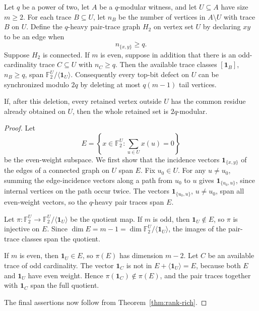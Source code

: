 \documentclass[thmsec,dntnbr,nolinenbrs]{dmgt}
\numberwithin{equation}{section}
\newcommand{\F}{\mathbb{F}}
\newcommand{\one}{\mathbf{1}}
\begin{document}
\begin{theorem}\label{thm:pair-trace-connected}
Let \(q\) be a power of two, let \(A\) be a \(q\)-modular witness, and let \(U\subseteq A\) have size \(m\ge 2\).  For each trace \(B\subseteq U\), let \(n_B\) be the number of vertices in \(A\setminus U\) with trace \(B\) on \(U\).  Define the \(q\)-heavy pair-trace graph \(H_2\) on vertex set \(U\) by declaring \(xy\) to be an edge when
\[
        n_{\{x,y\}}\ge q.
\]
Suppose \(H_2\) is connected.  If \(m\) is even, suppose in addition that there is an odd-cardinality trace \(C\subseteq U\) with \(n_C\ge q\).  Then the available trace classes \([\one_B]\), \(n_B\ge q\), span \(\F_2^U/\langle\one_U\rangle\).  Consequently every top-bit defect on \(U\) can be synchronized modulo \(2q\) by deleting at most \(q(m-1)\) tail vertices.

If, after this deletion, every retained vertex outside \(U\) has the common residue already obtained on \(U\), then the whole retained set is \(2q\)-modular.
\end{theorem}

\begin{proof}
Let
\[
        E=\left\{x\in\F_2^U:\sum_{u\in U}x(u)=0\right\}
\]
be the even-weight subspace.  We first show that the incidence vectors \(\one_{\{x,y\}}\) of the edges of a connected graph on \(U\) span \(E\).  Fix \(u_0\in U\).  For any \(u\ne u_0\), summing the edge-incidence vectors along a path from \(u_0\) to \(u\) gives \(\one_{\{u_0,u\}}\), since internal vertices on the path occur twice.  The vectors \(\one_{\{u_0,u\}}\), \(u\ne u_0\), span all even-weight vectors, so the \(q\)-heavy pair traces span \(E\).

Let \(\pi:\F_2^U\to \F_2^U/\langle\one_U\rangle\) be the quotient map.  If \(m\) is odd, then \(\one_U\notin E\), so \(\pi\) is injective on \(E\).  Since \(\dim E=m-1=\dim \F_2^U/\langle\one_U\rangle\), the images of the pair-trace classes span the quotient.

If \(m\) is even, then \(\one_U\in E\), so \(\pi(E)\) has dimension \(m-2\).  Let \(C\) be an available trace of odd cardinality.  The vector \(\one_C\) is not in \(E+\langle\one_U\rangle=E\), because both \(E\) and \(\one_U\) have even weight.  Hence \(\pi(\one_C)\notin \pi(E)\), and the pair traces together with \(\one_C\) span the full quotient.

The final assertions now follow from Theorem~\ref{thm:rank-rich}.
\end{proof}
\end{document}
